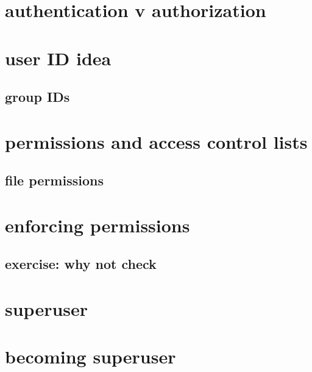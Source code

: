 \date{}
\title{}
\date{}

\begin{frame}
    \titlepage
\end{frame}




\section{authentication v authorization}


\section{user ID idea}


\subsection{group IDs}


\section{permissions and access control lists}
\subsection{file permissions}


\section{enforcing permissions}


\subsection{exercise: why not check}


\section{superuser}


\section{becoming superuser}

